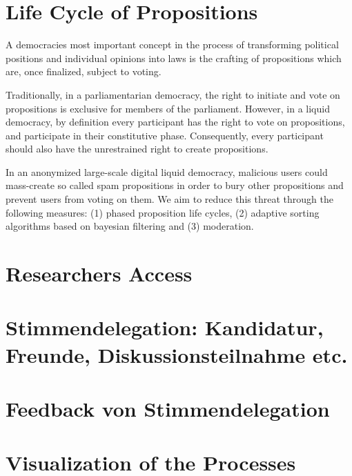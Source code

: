\section{Life Cycle of Propositions}
\label{sec:Model_Propositions}
A democracies most important concept in the process of transforming political positions and individual opinions into laws is the crafting of propositions which are, once finalized, subject to voting.

Traditionally, in a parliamentarian democracy, the right to initiate and vote on propositions is exclusive for members of the parliament.
However, in a liquid democracy, by definition every participant has the right to vote on propositions, and participate in their constitutive phase. Consequently, every participant should also have the unrestrained right to create propositions.

In an anonymized large-scale digital liquid democracy, malicious users could mass-create so called spam propositions in order to bury other propositions and prevent users from voting on them.
We aim to reduce this threat through the following measures: (1) phased proposition life cycles, (2) adaptive sorting algorithms based on bayesian filtering and (3) moderation.

\section{Researchers Access}
\label{sec:Model_ResearchersAccess}

\section{Stimmendelegation: Kandidatur, Freunde, Diskussionsteilnahme etc.}
\label{sec:Model_VoteDelegation}

\section{Feedback von Stimmendelegation}
\label{sec:Model_VoteFeedback}

\section{Visualization of the Processes}
\label{sec:Model_Visualization}